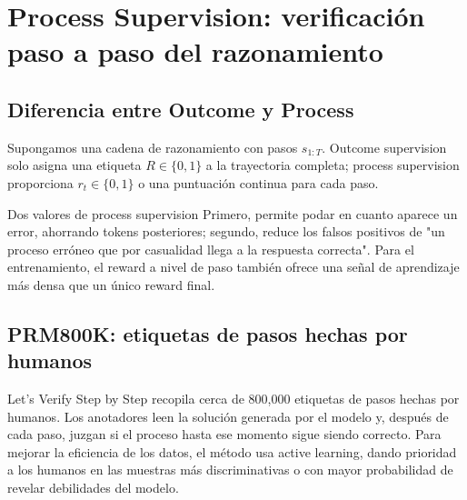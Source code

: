 \documentclass[a4paper]{article}
\begin{document}
\section{Process Supervision: verificación paso a paso del razonamiento}

\subsection{Diferencia entre Outcome y Process}

Supongamos una cadena de razonamiento con pasos $s_{1:T}$. Outcome supervision solo asigna una etiqueta $R\in\{0,1\}$ a la trayectoria completa; process supervision proporciona $r_t\in\{0,1\}$ o una puntuación continua para cada paso.



\begin{importantbox}{Dos valores de process supervision}
Primero, permite podar en cuanto aparece un error, ahorrando tokens posteriores; segundo, reduce los falsos positivos de "un proceso erróneo que por casualidad llega a la respuesta correcta". Para el entrenamiento, el reward a nivel de paso también ofrece una señal de aprendizaje más densa que un único reward final.
\end{importantbox}

\subsection{PRM800K: etiquetas de pasos hechas por humanos}

Let's Verify Step by Step recopila cerca de 800,000 etiquetas de pasos hechas por humanos. Los anotadores leen la solución generada por el modelo y, después de cada paso, juzgan si el proceso hasta ese momento sigue siendo correcto. Para mejorar la eficiencia de los datos, el método usa active learning, dando prioridad a los humanos en las muestras más discriminativas o con mayor probabilidad de revelar debilidades del modelo.

\end{document}
